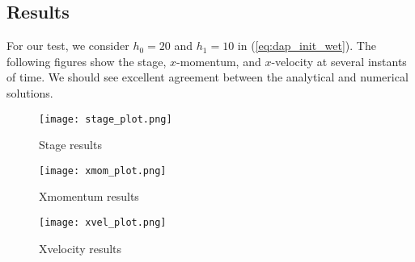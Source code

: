 \subsection{Results}

For our test, we consider $h_0=20$ and $h_1=10$ in (\ref{eq:dap_init_wet}).
The following figures show the stage, $x$-momentum, and $x$-velocity at several instants of time. We should see excellent agreement between the analytical and numerical solutions. 

\begin{figure}
\begin{center}
\texttt{[image: stage\_plot.png]}
\end{center}
\caption{Stage results}
\end{figure}


\begin{figure}
\begin{center}
\texttt{[image: xmom\_plot.png]}
\end{center}
\caption{Xmomentum results}
\end{figure}


\begin{figure}
\begin{center}
\texttt{[image: xvel\_plot.png]}
\end{center}
\caption{Xvelocity results}
\end{figure}


\endinput

